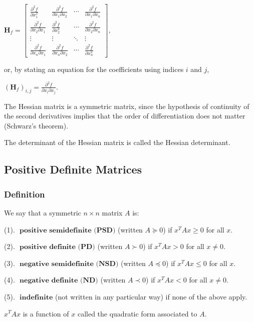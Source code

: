\documentclass[11pt,a4paper]{article}
\begin{document}
$
\mathbf{H}_{f}=\left[\begin{array}{cccc}
\frac{\partial^{2} f}{\partial x_{1}^{2}} & \frac{\partial^{2} f}{\partial x_{1} \partial x_{2}} & \cdots & \frac{\partial^{2} f}{\partial x_{1} \partial x_{n}} \\
\frac{\partial^{2} f}{\partial x_{2} \partial x_{1}} & \frac{\partial^{2} f}{\partial x_{2}^{2}} & \cdots & \frac{\partial^{2} f}{\partial x_{2} \partial x_{n}} \\
\vdots & \vdots & \ddots & \vdots \\
\frac{\partial^{2} f}{\partial x_{n} \partial x_{1}} & \frac{\partial^{2} f}{\partial x_{n} \partial x_{2}} & \cdots & \frac{\partial^{2} f}{\partial x_{n}^{2}}
\end{array}\right],
$

or, by stating an equation for the coefficients using indices $i$ and $j$,

$
\left(\mathbf{H}_{f}\right)_{i, j}=\frac{\partial^{2} f}{\partial x_{i} \partial x_{j}} .
$

The Hessian matrix is a symmetric matrix, since the hypothesis of continuity of the second derivatives implies that the order of differentiation does not matter (Schwarz's theorem).

The determinant of the Hessian matrix is called the Hessian determinant.

\subsection{Positive Definite Matrices}
\subsubsection{Definition}
We say that a symmetric $n \times n$ matrix $A$ is:

(1). $\textbf{ positive semidefinite (PSD)}$ (written $A \succeq 0$) if $x^TAx \geq 0$ for all $x$.

(2). $\textbf{ positive definite (PD)}$ (written $A \succ 0$) if $x^TAx > 0$ for all $x\neq 0$.

(3). $\textbf{ negative semidefinite (NSD)}$ (written $A \preceq 0$) if $x^TAx \leq 0$ for all $x$.

(4). $\textbf{ negative definite (ND)}$ (written $A \prec 0$) if $x^TAx < 0$ for all $x\neq 0$.

(5). $\textbf{ indefinite}$ (not written in any particular way) if none of the above apply.

$x^TAx$ is a function of $x$ called the quadratic form associated to $A$.
\end{document}
